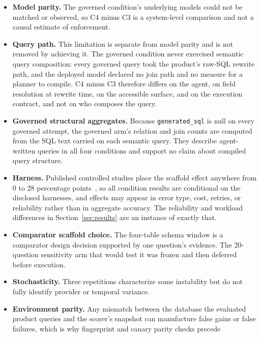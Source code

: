 \begin{itemize}[leftmargin=1.2em]
  SQL and rejects some extensionally equal results. Accuracy is accuracy under a
  pinned scorer, not proof of semantic equivalence, which is why the second
  comparator is reported alongside it everywhere.
  \item \textbf{Model parity.} The governed condition's underlying models could
  not be matched or observed, so C4 minus C3 is a system-level comparison and not
  a causal estimate of enforcement.
  \item \textbf{Query path.} This limitation is separate from model parity and is
  not removed by achieving it. The governed condition never exercised semantic
  query composition: every governed query took the product's raw-SQL rewrite
  path, and the deployed model declared no join path and no measure for a planner
  to compile. C4 minus C3 therefore differs on the agent, on field resolution at
  rewrite time, on the accessible surface, and on the execution contract, and not
  on who composes the query.
  \item \textbf{Governed structural aggregates.} Because \texttt{generated\_sql}
  is null on every governed attempt, the governed arm's relation and join counts
  are computed from the SQL text carried on each semantic query. They describe
  agent-written queries in all four conditions and support no claim about
  compiled query structure.
  \item \textbf{Harness.} Published controlled studies place the scaffold effect
  anywhere from 0 to 28 percentage points~\cite{arxiv-2607-22585,arxiv-2606-08529},
  so all condition results are conditional on the disclosed harnesses, and effects
  may appear in error type, cost, retries, or reliability rather than in aggregate
  accuracy. The reliability and workload differences in
  Section~\ref{sec:results} are an instance of exactly that.
  \item \textbf{Comparator scaffold choice.} The four-table schema window is a
  comparator design decision supported by one question's evidence. The 20-question
  sensitivity arm that would test it was frozen and then deferred before
  execution.
  \item \textbf{Stochasticity.} Three repetitions characterize some instability
  but do not fully identify provider or temporal variance.
  \item \textbf{Environment parity.} Any mismatch between the database the
  evaluated product queries and the scorer's snapshot can manufacture false gains
  or false failures, which is why fingerprint and canary parity checks precede

\end{itemize}
